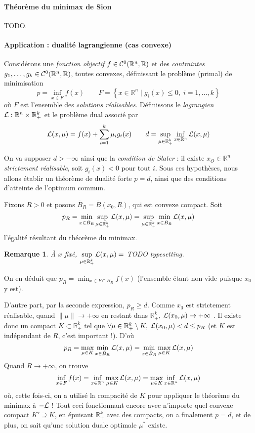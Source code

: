 \documentclass[a4paper, 11pt]{article}
\def\R{\mathbb{R}}
\def\L{{\cal{L}}}
\def\Cf{{\cal{C}}}
\newtheorem*{remark}{Remarque}
\begin{document}
\paragraph{Théorème du minimax de Sion} TODO.


\paragraph{Application : dualité lagrangienne (cas convexe)} Considérons une
\emph{fonction objectif} $f \in \Cf^0(\R^n, \R)$ et des \emph{contraintes}
$g_1, \ldots, g_k \in \Cf^0(\R^n, \R)$, toutes convexes, définissant le problème
(primal) de minimisation
\[ p = \inf_{x \in F} f(x) \qquad F = \left\{ x \in \R^n \mid
  g_i(x) \leq 0,\; i = 1,\ldots,k \right\} \]
où $F$ est l'ensemble des \emph{solutions réalisables}.
Définissons le \emph{lagrangien} $\L : \R^n \times \R_+^k$ et le problème dual
associé par
\[ \L(x, \mu) = f(x) + \sum_{i=1}^k \mu_i g_i(x) \qquad
  d = \sup_{\mu \in \R_+^k} \inf_{x \in \R^n} \L(x,\mu) \]

On va supposer $d > -\infty$ ainsi que la \emph{condition de Slater} : il existe
$x_O \in \R^n$ \emph{strictement réalisable}, soit $g_i(x) < 0$ pour tout $i$.
Sous ces hypothèses, nous allons établir un théorème de dualité forte $p = d$,
ainsi que des conditions d'atteinte de l'optimum commun.

Fixons $R > 0$ et posons $\bar{B}_R = \bar{B}(x_0,R)$, qui est convexe compact.
Soit
\[ p_R = \min_{x \in \bar{B}_R} \sup_{\mu \in \R_+^k} \L(x,\mu)
       = \sup_{\mu \in \R_+^k} \min_{x \in \bar{B}_R} \L(x,\mu) \]
l'égalité résultant du théorème du minimax.
\begin{remark}
  À $x$ fixé, $\displaystyle \sup_{\mu \in \R_+^k} \L(x,\mu) = $ TODO typesetting.
\end{remark}
On en déduit que $p_R = \min_{x \in F \cap B_R} f(x)$ (l'ensemble étant non vide
puisque $x_0$ y est).

D'autre part, par la seconde expression, $p_R \geq d$. Comme $x_0$ est
strictement réalisable, quand $\|\mu\| \to +\infty$ en restant dans $\R_+^k$,
$\L(x_0, \mu) \to +\infty$ . Il existe donc un compact $K \subset \R_+^k$ tel
que $\forall \mu \in \R_+^k \setminus K,\; \L(x_0, \mu) < d \leq p_R$ (et $K$
est indépendant de $R$, c'est important !). D'où
\[ p_R = \max_{\mu \in K} \min_{x \in \bar{B}_R} \L(x,\mu) =
  \min_{x \in \bar{B}_R} \max_{\mu \in K} \L(x,\mu) \]
Quand $R \to +\infty$, on trouve
\[ \inf_{x \in F} f(x) = \inf_{x \in \R^n} \max_{\mu \in K} \L(x,\mu) 
  = \max_{\mu \in K} \inf_{x \in \R^n} \L(x,\mu)  \]
où, cette fois-ci, on a utilisé la compacité de $K$ pour appliquer le théorème
du minimax à $-\L$ ! Tout ceci fonctionnant encore avec n'importe quel convexe
compact $K' \supseteq K$, en épuisant $\R_+^k$ avec des compacts, on a
finalement $p = d$, et de plus, on sait qu'une solution duale optimale $\mu^*$
existe.
\end{document}
